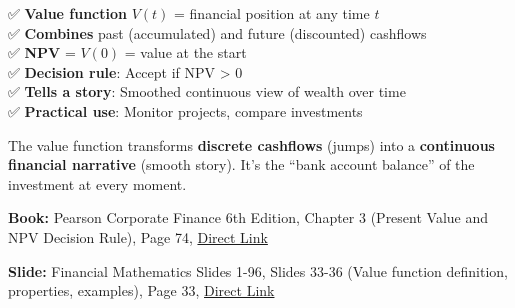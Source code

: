 \documentclass[
  letterpaper,
]{scrbook}
\begin{document}
✅ \textbf{Value function} \(V(t)\) = financial position at any time
\(t\)\\
✅ \textbf{Combines} past (accumulated) and future (discounted)
cashflows\\
✅ \textbf{NPV} = \(V(0)\) = value at the start\\
✅ \textbf{Decision rule}: Accept if NPV \textgreater{} 0\\
✅ \textbf{Tells a story}: Smoothed continuous view of wealth over
time\\
✅ \textbf{Practical use}: Monitor projects, compare investments

\begin{tcolorbox}[enhanced jigsaw, toptitle=1mm, colbacktitle=quarto-callout-important-color!10!white, opacityback=0, leftrule=.75mm, breakable, colframe=quarto-callout-important-color-frame, toprule=.15mm, opacitybacktitle=0.6, coltitle=black, bottomrule=.15mm, colback=white, arc=.35mm, titlerule=0mm, rightrule=.15mm, left=2mm, title=\textcolor{quarto-callout-important-color}{\faExclamation}\hspace{0.5em}{Key Insight}, bottomtitle=1mm]

The value function transforms \textbf{discrete cashflows} (jumps) into a
\textbf{continuous financial narrative} (smooth story). It's the ``bank
account balance'' of the investment at every moment.

\end{tcolorbox}

\begin{tcolorbox}[enhanced jigsaw, toptitle=1mm, colbacktitle=quarto-callout-caution-color!10!white, opacityback=0, leftrule=.75mm, breakable, colframe=quarto-callout-caution-color-frame, toprule=.15mm, opacitybacktitle=0.6, coltitle=black, bottomrule=.15mm, colback=white, arc=.35mm, titlerule=0mm, rightrule=.15mm, left=2mm, title=\textcolor{quarto-callout-caution-color}{\faFire}\hspace{0.5em}{References}, bottomtitle=1mm]

\textbf{Book:} Pearson Corporate Finance 6th Edition, Chapter 3 (Present
Value and NPV Decision Rule), Page 74,
\href{https://cdn.jsdelivr.net/gh/mrbungie/financial_maths@main/resources/books/pearson_corporate_finance_6th.pdf\#page=74}{Direct
Link}

\textbf{Slide:} Financial Mathematics Slides 1-96, Slides 33-36 (Value
function definition, properties, examples), Page 33,
\href{https://cdn.jsdelivr.net/gh/mrbungie/financial_maths@main/resources/slideshows/25_09_30_FinancialMathematics_Slides_1_96.pdf\#page=33}{Direct
Link}

\end{tcolorbox}
\end{document}
